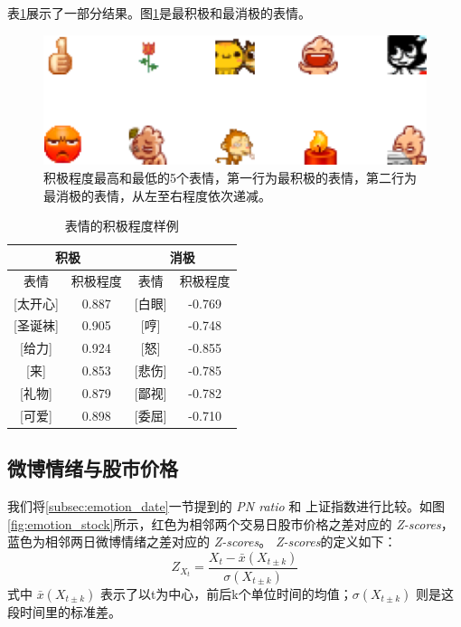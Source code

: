 \documentclass[12pt, oneside]{article}
\begin{document}
\begin{spacing}{1.5}
\begin{CJK}{UTF8}{gbsn}
表\ref{tbl:weighted_expreesions}展示了一部分结果。图\ref{fig:weighted_expressions_top5}是最积极和最消极的表情。

\begin{figure}
	\centering
	\includegraphics[width=0.35\linewidth]{../result/charts/weighted_expressions_top5}
	\caption{积极程度最高和最低的5个表情，第一行为最积极的表情，第二行为最消极的表情，从左至右程度依次递减。}
	\label{fig:weighted_expressions_top5}
\end{figure}

\begin{table}[]
\centering
\begin{tabular}{|c|c|c|c|}
\hline
\multicolumn{2}{|c|}{积极} & \multicolumn{2}{c|}{消极} \\ \hline
表情            & 积极程度     & 表情          & 积极程度      \\ \hline
{[}太开心{]}     & 0.887    & {[}白眼{]}    & -0.769    \\ \hline
{[}圣诞袜{]}     & 0.905    & {[}哼{]}     & -0.748    \\ \hline
{[}给力{]}      & 0.924    & {[}怒{]}     & -0.855    \\ \hline
{[}来{]}       & 0.853    & {[}悲伤{]}    & -0.785    \\ \hline
{[}礼物{]}      & 0.879    & {[}鄙视{]}    & -0.782    \\ \hline
{[}可爱{]}      & 0.898    & {[}委屈{]}    & -0.710    \\ \hline
\end{tabular}
\caption{表情的积极程度样例}
\label{tbl:weighted_expreesions}
\end{table}

\subsection{微博情绪与股市价格}
我们将\ref{subsec:emotion_date}一节提到的 {\it PN ratio} 和 上证指数进行比较。如图\ref{fig:emotion_stock}所示，红色为相邻两个交易日股市价格之差对应的 {\it Z-scores}，蓝色为相邻两日微博情绪之差对应的 {\it Z-scores}。 {\it Z-scores}的定义如下：
$$ Z_{X_t} = \frac{X_t - \bar{x}(X_{t \pm k})}{\sigma(X_{t \pm k})}$$
式中 $\bar{x}(X_{t \pm k})$ 表示了以t为中心，前后k个单位时间的均值；$\sigma(X_{t \pm k})$ 则是这段时间里的标准差。


\end{CJK}
\end{spacing}
\end{document}
